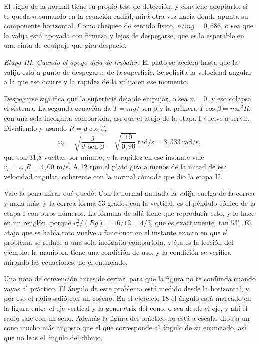 \documentclass[11pt,openany]{book}
\newcommand{\sen}{\operatorname{sen}}
\begin{document}
\begin{ejemplo}[completo]
El signo de la normal tiene su propio test de detección, y conviene adoptarlo: si te queda $n$ sumando en la ecuación radial, mirá otra vez hacia dónde apunta su componente horizontal. Como chequeo de sentido físico, $n/mg = 0{,}686$, o sea que la valija está apoyada con firmeza y lejos de despegarse, que es lo esperable en una cinta de equipaje que gira despacio.

\medskip
\textit{Etapa III. Cuando el apoyo deja de trabajar.} El plato se acelera hasta que la valija está a punto de despegarse de la superficie. Se solicita la velocidad angular a la que eso ocurre y la rapidez de la valija en ese momento.

Despegarse significa que la superficie deja de empujar, o sea $n = 0$, y eso colapsa el sistema. La segunda ecuación da $T = mg/\sen\beta$ y la primera $T\cos\beta = m\omega^2 R$, con una sola incógnita compartida, así que el atajo de la etapa I vuelve a servir. Dividiendo y usando $R = d\cos\beta$,
\[
\omega_c = \sqrt{\frac{g}{d\,\sen\beta}} = \sqrt{\frac{10}{0{,}90}}\ \mathrm{rad/s} = 3{,}333\ \mathrm{rad/s} ,
\]
que son 31,8 vueltas por minuto, y la rapidez en ese instante vale $v_c = \omega_c R = 4{,}00$ m/s. A 12 rpm el plato gira a menos de la mitad de esa velocidad angular, coherente con la normal cómoda que dio la etapa II.

Vale la pena mirar qué quedó. Con la normal anulada la valija cuelga de la correa y nada más, y la correa forma 53 grados con la vertical: es el péndulo cónico de la etapa I con otros números. La fórmula de allá tiene que reproducir esto, y lo hace en un renglón, porque $v_c^2/(Rg) = 16/12 = 4/3$, que es exactamente $\tan 53^\circ$. El atajo que se había roto vuelve a funcionar en el instante exacto en que el problema se reduce a una sola incógnita compartida, y ésa es la lección del ejemplo: la maniobra tiene una condición de uso, y la condición se verifica mirando las ecuaciones, no el enunciado.

Una nota de convención antes de cerrar, para que la figura no te confunda cuando vayas al práctico. El ángulo de este problema está medido desde la horizontal, y por eso el radio salió con un coseno. En el ejercicio 18 el ángulo está marcado en la figura entre el eje vertical y la generatriz del cono, o sea desde el eje, y ahí el radio sale con un seno. Además la figura del práctico no está a escala: dibuja un cono mucho más angosto que el que corresponde al ángulo de su enunciado, así que no leas el ángulo del dibujo.
\end{ejemplo}
\end{document}
